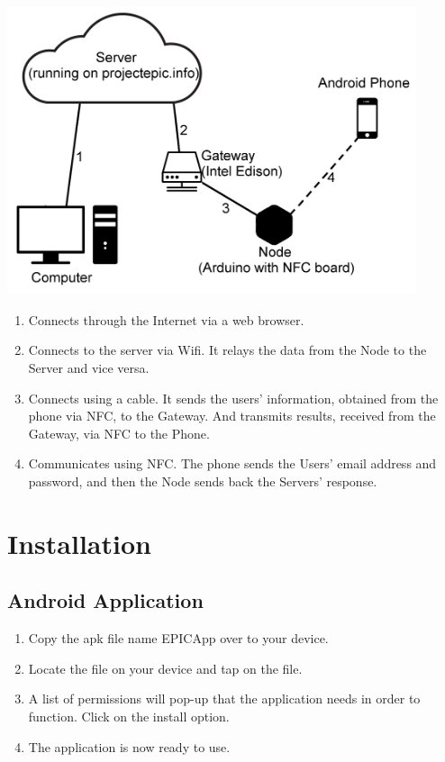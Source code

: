\documentclass{article}
\begin{document}
\includegraphics[width=12cm, height=8.5cm]{SystemLayout}
\begin{enumerate}
\item Connects through the Internet via a web browser.
\item Connects to the server via Wifi. It relays the data from the Node to the Server and vice versa.
\item Connects using a cable. It sends the users' information, obtained from the phone via NFC, to the Gateway. And transmits results, received from the Gateway, via NFC to the Phone.
\item Communicates using NFC. The phone sends the Users' email address and password, and then the Node sends back the Servers' response.
\end{enumerate}



\newpage
\section{Installation}

\subsection{Android Application}
\begin{enumerate}
\item Copy the apk file name EPICApp over to your device.
\item Locate the file on your device and tap on the file.
\item A list of permissions will pop-up that the application needs in order to function. Click on the install option.
\item The application is now ready to use.
\end{enumerate}
\end{document}
